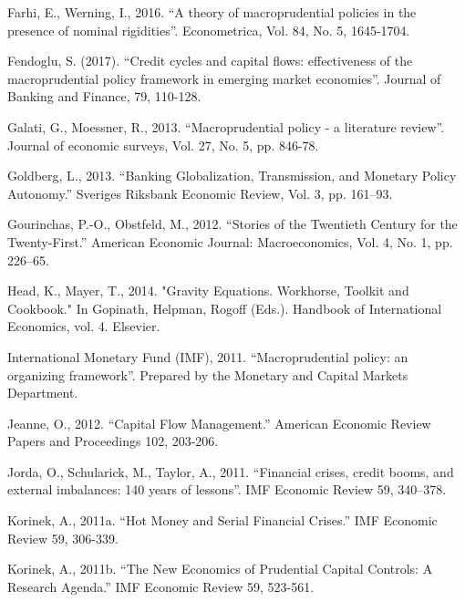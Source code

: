 \documentclass[12pt,a4paper]{article}
\begin{document}
Farhi, E., Werning, I., 2016. “A theory of macroprudential policies in the presence of nominal rigidities”. Econometrica, Vol. 84, No. 5, 1645-1704.

Fendoglu, S. (2017). “Credit cycles and capital flows: effectiveness of the macroprudential policy framework in emerging market economies”. Journal of Banking and Finance, 79, 110-128.



Galati, G., Moessner, R., 2013. “Macroprudential policy - a literature review”. Journal of economic surveys, Vol. 27, No. 5, pp. 846-78.

Goldberg, L., 2013. “Banking Globalization, Transmission, and Monetary Policy Autonomy.” Sveriges Riksbank Economic Review, Vol. 3, pp. 161–93.

Gourinchas, P.-O., Obstfeld, M., 2012. “Stories of the Twentieth Century for the Twenty-First.” American Economic Journal: Macroeconomics, Vol. 4, No. 1, pp. 226–65.

Head, K., Mayer, T., 2014. "Gravity Equations. Workhorse, Toolkit and Cookbook." In Gopinath, Helpman, Rogoff (Eds.). Handbook of International Economics, vol. 4. Elsevier.

International Monetary Fund (IMF), 2011. “Macroprudential policy: an organizing framework”. Prepared by the Monetary and Capital Markets Department.

Jeanne, O., 2012. “Capital Flow Management.” American Economic Review Papers and Proceedings 102, 203-206.

Jorda, O., Schularick, M., Taylor, A., 2011. “Financial crises, credit booms, and external imbalances: 140 years of lessons”. IMF Economic Review 59, 340–378.


Korinek, A., 2011a. “Hot Money and Serial Financial Crises.” IMF Economic Review 59, 306-339.

Korinek, A., 2011b. “The New Economics of Prudential Capital Controls: A Research Agenda.” IMF Economic Review 59, 523-561.
\end{document}
